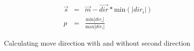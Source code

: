 \documentclass[11pt]{article}
\begin{document}
\begin{eqnarray}
\vec{s} & = & \vec{m}-\vec{dir} * \text{min} \left( |dir_i| \right) \\
p & = & \frac{\text{min}|dir_i|}{\text{max} |dir_i|}
\end{eqnarray}

\begin{figure}[h!]
   \centering
    \hspace*{1cm}
   \caption[Comparison: Using second direction or not]{Calculating move direction with and without second direction}
\label{secdir}
\end{figure}
\end{document}
